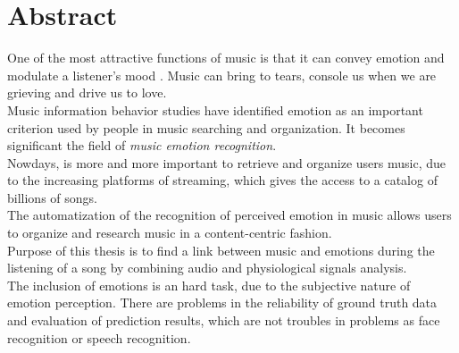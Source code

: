 \chapter{Abstract}
\label{Abstract}
\thispagestyle{empty}

\indent One of the most attractive functions of music is that it can convey emotion and modulate a listener's mood \cite{feng2003popular}. Music can bring to tears, console us when we are grieving and drive us to love.
\\
Music information behavior studies have identified emotion as an important criterion used by people in music searching and organization. It becomes significant the field of \textit{music emotion recognition}.
\\ \indent
Nowdays, is more and more important to retrieve and organize users music, due to the increasing platforms of streaming, which gives the access to a catalog of billions of songs.
\\
The automatization of the recognition of perceived emotion in music allows users to organize and research music in a content-centric fashion.
\\ \indent
Purpose of this thesis is to find a link between music and emotions during the listening of a song by combining audio and physiological signals analysis.
\\ \indent
The inclusion of emotions is an hard task, due to the subjective nature of emotion perception. There are problems in the reliability of ground truth data and evaluation of prediction results, which are not troubles in problems as face recognition or speech recognition.